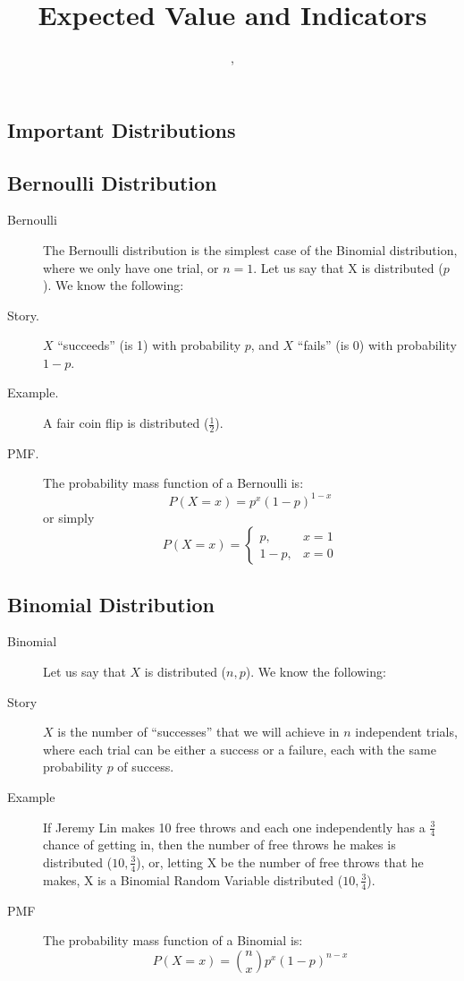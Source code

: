 \documentclass[11pt]{article}
\title{Expected Value and Indicators}
\author{\justin, \michael}
\begin{document}
\maketitle

\begin{notes}

\section*{Important Distributions}

\subsection*{Bernoulli Distribution}
\begin{description}
    \item[Bernoulli] The Bernoulli distribution is the simplest case of the Binomial distribution, where we only have one trial, or $n=1$. Let us say that X is distributed \Bern($p$). We know the following:
	\item[Story.] $X$ ``succeeds'' (is 1) with probability $p$, and $X$ ``fails'' (is 0) with probability $1-p$.
	\item[Example.] A fair coin flip is distributed \Bern($\frac{1}{2}$).
	\item[PMF.] The probability mass function of a Bernoulli is:
\[P(X = x) = p^x(1-p)^{1-x}\]
or simply
\[P(X = x) = \begin{cases} p, & x = 1 \\ 1-p, & x = 0 \end{cases}\]
\end{description}

\subsection*{Binomial Distribution}
\begin{description}
    \item[Binomial] Let us say that $X$ is distributed \Bin($n,p$). We know the following:
	\item[Story] $X$ is the number of ``successes'' that we will achieve in $n$ independent trials, where each trial can be either a success or a failure, each with the same probability $p$ of success.
	\item[Example] If Jeremy Lin makes 10 free throws and each one independently has a $\frac{3}{4}$ chance of getting in, then the number of free throws he makes is distributed  \Bin($10,\frac{3}{4}$), or, letting X be the number of free throws that he makes, X is a Binomial Random Variable distributed  \Bin($10,\frac{3}{4}$).
	\item[PMF] The probability mass function of a Binomial is:
\[P(X = x) = {n  \choose x} p^x(1-p)^{n-x}\]
\end{description}


\end{notes}
\end{document}

